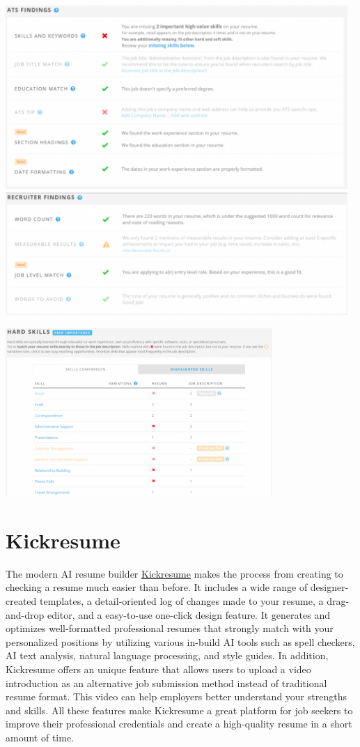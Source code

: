 \documentclass[
]{book}
\begin{document}
\includegraphics[width=5.11458in,height=\textheight]{Jobscan findings.png}

\includegraphics[width=3.98958in,height=\textheight]{Jobscan findings 2.png}

\hypertarget{kickresume}{%
\section{Kickresume}\label{kickresume}}

The modern AI resume builder \href{https://www.kickresume.com/en/}{Kickresume} makes the process from creating to checking a resume much easier than before. It includes a wide range of designer-created templates, a detail-oriented log of changes made to your resume, a drag-and-drop editor, and a easy-to-use one-click design feature. It generates and optimizes well-formatted professional resumes that strongly match with your personalized positions by utilizing various in-build AI tools such as spell checkers, AI text analysis, natural language processing, and style guides. In addition, Kickresume offers an unique feature that allows users to upload a video introduction as an alternative job submission method instead of traditional resume format. This video can help employers better understand your strengths and skills. All these features make Kickresume a great platform for job seekers to improve their professional credentials and create a high-quality resume in a short amount of time.
\end{document}
